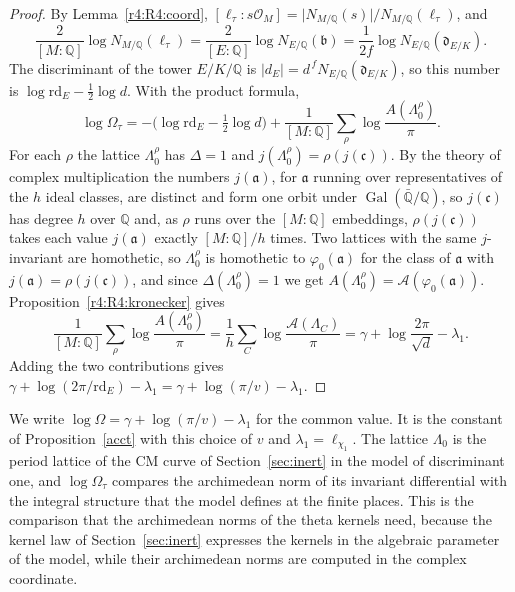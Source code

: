 \begin{proof}
By Lemma~\ref{r4:R4:coord}, $[\ell_\tau:s\mathcal O_M]=\lvert N_{M/\mathbb Q}(s)\rvert/N_{M/\mathbb Q}(\ell_\tau)$, and
\[
\frac2{[M:\mathbb Q]}\log N_{M/\mathbb Q}(\ell_\tau)=\frac2{[E:\mathbb Q]}\log N_{E/\mathbb Q}(\mathfrak b)=\frac1{2f}\log N_{E/\mathbb Q}(\mathfrak d_{E/K}).
\]
The discriminant of the tower $E/K/\mathbb Q$ is $\lvert d_E\rvert=d^{\,f}N_{E/\mathbb Q}(\mathfrak d_{E/K})$, so this number is $\log\mathrm{rd}_E-\frac12\log d$. With the product formula,
\[
\log\Omega_\tau=-\Big(\log\mathrm{rd}_E-\tfrac12\log d\Big)+\frac1{[M:\mathbb Q]}\sum_\rho\log\frac{A(\Lambda_0^\rho)}\pi .
\]
For each $\rho$ the lattice $\Lambda_0^\rho$ has $\Delta=1$ and $j(\Lambda_0^\rho)=\rho(j(\mathfrak c))$. By the theory of complex multiplication the numbers $j(\mathfrak a)$, for $\mathfrak a$ running over representatives of the $h$ ideal classes, are distinct and form one orbit under $\operatorname{Gal}(\bar{\mathbb Q}/\mathbb Q)$, so $j(\mathfrak c)$ has degree $h$ over $\mathbb Q$ and, as $\rho$ runs over the $[M:\mathbb Q]$ embeddings, $\rho(j(\mathfrak c))$ takes each value $j(\mathfrak a)$ exactly $[M:\mathbb Q]/h$ times. Two lattices with the same $j$-invariant are homothetic, so $\Lambda_0^\rho$ is homothetic to $\varphi_0(\mathfrak a)$ for the class of $\mathfrak a$ with $j(\mathfrak a)=\rho(j(\mathfrak c))$, and since $\Delta(\Lambda_0^\rho)=1$ we get $A(\Lambda_0^\rho)=\mathcal A(\varphi_0(\mathfrak a))$. Proposition~\ref{r4:R4:kronecker} gives
\[
\frac1{[M:\mathbb Q]}\sum_\rho\log\frac{A(\Lambda_0^\rho)}\pi=\frac1h\sum_C\log\frac{\mathcal A(\Lambda_C)}\pi=\gamma+\log\frac{2\pi}{\sqrt d}-\lambda_1 .
\]
Adding the two contributions gives $\gamma+\log(2\pi/\mathrm{rd}_E)-\lambda_1=\gamma+\log(\pi/v)-\lambda_1$.
\end{proof}

We write $\log\Omega=\gamma+\log(\pi/v)-\lambda_1$ for the common value. It is the constant of Proposition~\ref{acct} with this choice of $v$ and $\lambda_1=\ell_{\chi_1}$. The lattice $\Lambda_0$ is the period lattice of the CM curve of Section~\ref{sec:inert} in the model of discriminant one, and $\log\Omega_\tau$ compares the archimedean norm of its invariant differential with the integral structure that the model defines at the finite places. This is the comparison that the archimedean norms of the theta kernels need, because the kernel law of Section~\ref{sec:inert} expresses the kernels in the algebraic parameter of the model, while their archimedean norms are computed in the complex coordinate.


